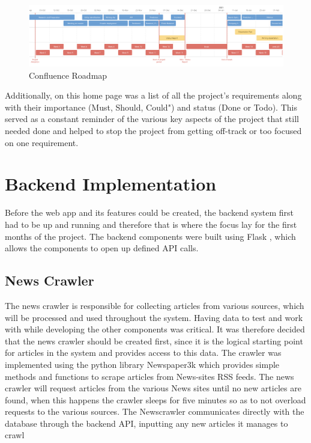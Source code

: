         \begin{figure}[!h]
            \centering
            \includegraphics[width=0.9\linewidth]{images/upload/Roadmap.png}    
            \caption{Confluence Roadmap}
            \label{fig:Confluence_Roadmap}
        \end{figure}
        
        Additionally, on this home page was a list of all the project's requirements along with their importance (Must, Should, Could") and status (Done or Todo). This served as a constant reminder of the various key aspects of the project that still needed done and helped to stop the project from getting off-track or too focused on one requirement. 
        
        
    \section{Backend Implementation}
    Before the web app and its features could be created, the backend system first had to be up and running and therefore that is where the focus lay for the first months of the project. The backend components were built using Flask \citep{technology:Flask}, which allows the components to open up defined API calls.
    
        \subsection{News Crawler}
        The news crawler is responsible for collecting articles from various sources, which will be processed and used throughout the system. Having data to test and work with while developing the other components was critical. It was therefore decided that the news crawler should be created first, since it is the logical starting point for articles in the system and provides access to this data. The crawler was implemented using the python library Newspaper3k \citep{technology:Newspaper} which provides simple methods and functions to scrape articles from News-sites RSS feeds. The news crawler will request articles from the various News sites until no new articles are found, when this happens the crawler sleeps for five minutes so as to not overload requests to the various sources. The Newscrawler communicates directly with the database through the backend API, inputting any new articles it manages to crawl
        
